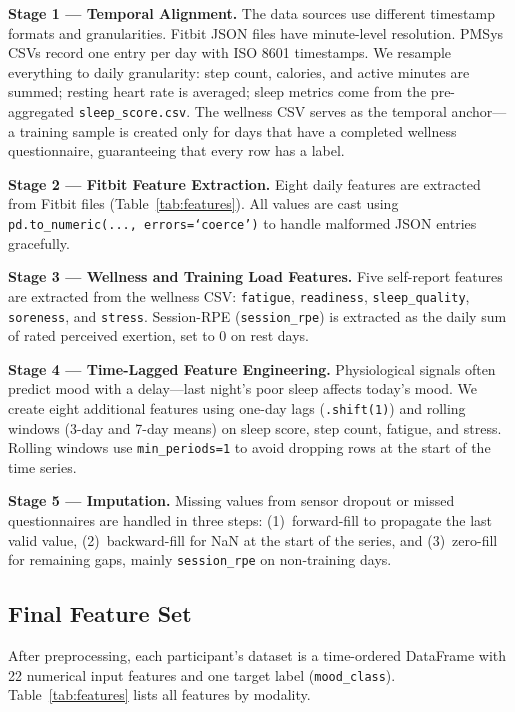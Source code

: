 \documentclass[conference]{IEEEtran}
\begin{document}
\textbf{Stage 1 --- Temporal Alignment.}
The data sources use different timestamp formats and granularities. Fitbit JSON files
have minute-level resolution. PMSys CSVs record one entry per day with ISO 8601
timestamps. We resample everything to daily granularity: step count, calories, and
active minutes are summed; resting heart rate is averaged; sleep metrics come from
the pre-aggregated \texttt{sleep\_score.csv}. The wellness CSV serves as the temporal
anchor---a training sample is created only for days that have a completed wellness
questionnaire, guaranteeing that every row has a label.

\textbf{Stage 2 --- Fitbit Feature Extraction.}
Eight daily features are extracted from Fitbit files (Table~\ref{tab:features}).
All values are cast using \texttt{pd.to\_numeric(..., errors=`coerce')} to handle
malformed JSON entries gracefully.

\textbf{Stage 3 --- Wellness and Training Load Features.}
Five self-report features are extracted from the wellness CSV: \texttt{fatigue},
\texttt{readiness}, \texttt{sleep\_quality}, \texttt{soreness},
and \texttt{stress}. Session-RPE (\texttt{session\_rpe}) is extracted as the daily sum
of rated perceived exertion, set to 0 on rest days.

\textbf{Stage 4 --- Time-Lagged Feature Engineering.}
Physiological signals often predict mood with a delay---last night's poor sleep
affects today's mood. We create eight additional features using one-day lags
(\texttt{.shift(1)}) and rolling windows (3-day and 7-day means) on sleep score,
step count, fatigue, and stress. Rolling windows use \texttt{min\_periods=1}
to avoid dropping rows at the start of the time series.

\textbf{Stage 5 --- Imputation.}
Missing values from sensor dropout or missed questionnaires are handled in three steps:
(1)~forward-fill to propagate the last valid value, (2)~backward-fill for NaN at the
start of the series, and (3)~zero-fill for remaining gaps, mainly \texttt{session\_rpe}
on non-training days.

\subsection{Final Feature Set}

After preprocessing, each participant's dataset is a time-ordered DataFrame with
22 numerical input features and one target label (\texttt{mood\_class}).
Table~\ref{tab:features} lists all features by modality.
\end{document}
